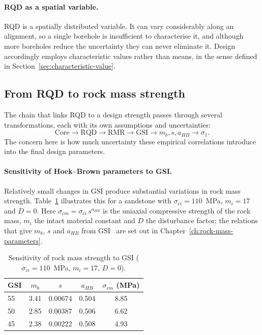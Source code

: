 \paragraph{RQD as a spatial variable.}
RQD is a spatially distributed variable. It can vary
considerably along an alignment, so a single borehole is insufficient to
characterise it, and although more boreholes reduce the uncertainty they can
never eliminate it. Design accordingly employs characteristic values rather than
means, in the sense defined in
Section~\ref{sec:characteristic-value}.

\subsection{From RQD to rock mass strength}
\label{sec:rqd-to-strength}

The chain that links RQD to a design strength passes through several
transformations, each with its own assumptions and uncertainties:
\[
\text{Core} \rightarrow \text{RQD} \rightarrow \text{RMR} \rightarrow \text{GSI} \rightarrow m_b, s, a_{HB} \rightarrow \sigma_1 .
\]
The concern here is how much uncertainty these empirical correlations
introduce into the final design parameters.

\paragraph{Sensitivity of Hoek--Brown parameters to GSI.}
Relatively small changes in GSI produce substantial variations in rock mass
strength. Table~\ref{tab:sensitivity} illustrates this for a sandstone with
$\sigma_{ci}=110$~MPa, $m_i=17$ and $D=0$. Here
\(\sigma_{cm} = \sigma_{ci}\,s^{a_{HB}}\) is the uniaxial compressive strength
of the rock mass, \(m_i\) the intact material constant and \(D\) the
disturbance factor; the relations that give \(m_b\), \(s\) and \(a_{HB}\) from
GSI~\citep{hoek2019hb} are set out in Chapter~\ref{ch:rock-mass-parameters}.

\begin{table}[htbp]
\caption{Sensitivity of rock mass strength to GSI ($\sigma_{ci}=110$~MPa, $m_i=17$, $D=0$).}
\label{tab:sensitivity}
\centering
\small
\begin{tabular}{lcccc}
\toprule
\textbf{GSI} & \textbf{\(m_b\)} & \textbf{\(s\)} & \textbf{\(a_{HB}\)} & \textbf{\(\sigma_{cm}\) (MPa)} \\
\midrule
55 & 3.41 & 0.00674 & 0.504 & 8.85 \\
50 & 2.85 & 0.00387 & 0.506 & 6.62 \\
45 & 2.38 & 0.00222 & 0.508 & 4.93 \\
\bottomrule
\end{tabular}
\end{table}

